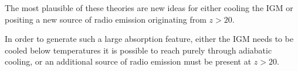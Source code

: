 \begin{bibunit}
The most plausible of these theories are new ideas for either cooling the IGM or positing a new
source of radio emission originating from $z > 20$.

In order to generate such a large
absorption feature, either the IGM needs to be cooled below temperatures it is possible to reach
purely through adiabatic cooling, or an additional source of radio emission must be present at $z >
20$.

\citep{2018arXiv180301815E}

\citep{2018Natur.555...71B}

\citep{2018arXiv180303091B}


\citep{2017PASP..129d5001D}



\citep{2013ExA....36..235M}












\end{bibunit}


